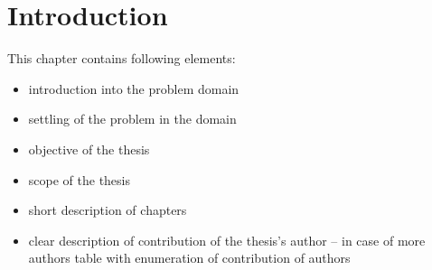 \chapter{Introduction}
This chapter contains following elements:
\begin{itemize}
\item introduction into the problem domain
\item settling of the problem in the domain
\item objective of the thesis 
\item scope of the thesis
\item short description of chapters
\item clear description of contribution of the thesis's author – in case of more authors table with enumeration of contribution of authors
\end{itemize}
